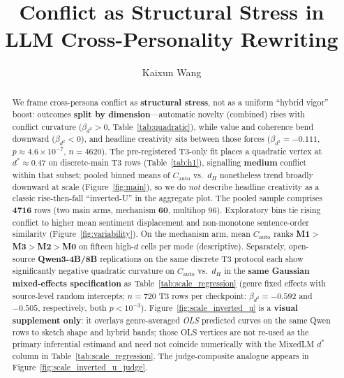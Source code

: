 \documentclass[sigconf,nonacm]{acmart}
\title[Conflict as Structural Stress in LLM Cross-Personality Rewriting]{Conflict as Structural Stress in LLM Cross-Personality Rewriting}
\author{Kaixun Wang}
\affiliation{
  \institution{Southern University of Science and Technology}
  \city{Shenzhen}
  \country{China}
}
\begin{document}
\begin{abstract}
We frame cross-persona conflict as \textbf{structural stress}, not as a uniform ``hybrid vigor'' boost: outcomes \textbf{split by dimension}---automatic novelty (combined) rises with conflict curvature ($\beta_{d^2}{>}0$, Table~\ref{tab:quadratic}), while value and coherence bend downward ($\beta_{d^2}{<}0$), and headline creativity sits between those forces ($\beta_{d^2}{=}{-}0.111$, $p{\approx}4.6{\times}10^{-7}$, $n{=}4620$).
The pre-registered T3-only fit places a quadratic vertex at $d^\ast{\approx}0.47$ on discrete-main T3 rows (Table~\ref{tab:h1}), signalling \textbf{medium} conflict within that subset; pooled binned means of $C_{\mathrm{auto}}$ vs.\ $d_H$ nonetheless trend broadly downward at scale (Figure~\ref{fig:main}), so we do \emph{not} describe headline creativity as a classic rise-then-fall ``inverted-U'' in the aggregate plot.
The pooled sample comprises \textbf{4716} rows (two main arms, mechanism \textbf{60}, multihop 96). Exploratory bins tie rising conflict to higher mean sentiment displacement and non-monotone sentence-order similarity (Figure~\ref{fig:variability}). On the mechanism arm, mean $C_{\mathrm{auto}}$ ranks \textbf{M1}${>}$\textbf{M3}${>}$\textbf{M2}${>}$\textbf{M0} on fifteen high-$d$ cells per mode (descriptive).
Separately, open-source \textbf{Qwen3-4B/8B} replications on the same discrete T3 protocol each show significantly negative quadratic curvature on $C_{\mathrm{auto}}$ vs.\ $d_H$ in the \textbf{same Gaussian mixed-effects specification} as Table~\ref{tab:scale_regression} (genre fixed effects with source-level random intercepts; $n{=}720$ T3 rows per checkpoint: $\beta_{d^2}{=}{-}0.592$ and $-0.505$, respectively, both $p{<}10^{-3}$).
Figure~\ref{fig:scale_inverted_u} is a \textbf{visual supplement only}: it overlays genre-averaged \emph{OLS} predicted curves on the same Qwen rows to sketch shape and hybrid bands; those OLS vertices are not re-used as the primary inferential estimand and need not coincide numerically with the MixedLM $d^\ast$ column in Table~\ref{tab:scale_regression}.
The judge-composite analogue appears in Figure~\ref{fig:scale_inverted_u_judge}.
\end{abstract}


\maketitle
\end{document}

